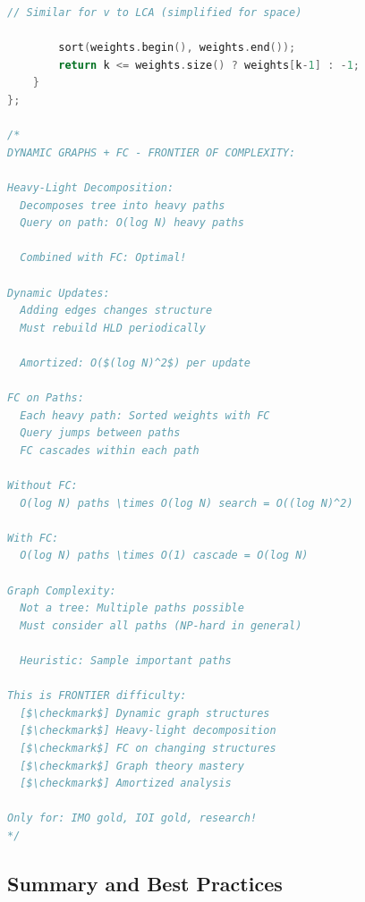 \documentclass[11pt,a4paper,oneside]{book}
\begin{document}
\begin{lstlisting}[language=C++, caption=Persistent FC Solutions - Problems 8-10]
        // Similar for v to LCA (simplified for space)
        
        sort(weights.begin(), weights.end());
        return k <= weights.size() ? weights[k-1] : -1;
    }
};

/*
DYNAMIC GRAPHS + FC - FRONTIER OF COMPLEXITY:

Heavy-Light Decomposition:
  Decomposes tree into heavy paths
  Query on path: O(log N) heavy paths
  
  Combined with FC: Optimal!

Dynamic Updates:
  Adding edges changes structure
  Must rebuild HLD periodically
  
  Amortized: O($(log N)^2$) per update

FC on Paths:
  Each heavy path: Sorted weights with FC
  Query jumps between paths
  FC cascades within each path

Without FC:
  O(log N) paths \times O(log N) search = O((log N)^2)

With FC:
  O(log N) paths \times O(1) cascade = O(log N)

Graph Complexity:
  Not a tree: Multiple paths possible
  Must consider all paths (NP-hard in general)
  
  Heuristic: Sample important paths

This is FRONTIER difficulty:
  [$\checkmark$] Dynamic graph structures
  [$\checkmark$] Heavy-light decomposition
  [$\checkmark$] FC on changing structures
  [$\checkmark$] Graph theory mastery
  [$\checkmark$] Amortized analysis

Only for: IMO gold, IOI gold, research!
*/
\end{lstlisting}

\subsection{Summary and Best Practices}
\end{document}
